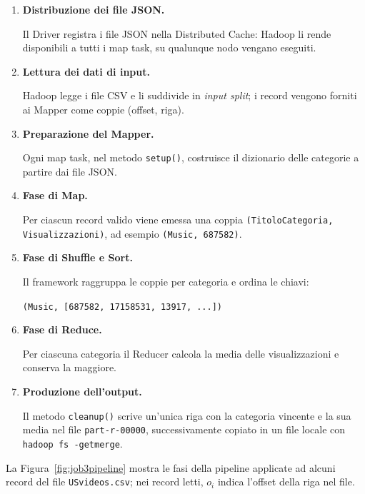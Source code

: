 \documentclass[12pt, a4paper]{article}
\begin{document}
\begin{enumerate}

    \item \textbf{Distribuzione dei file JSON.}

    Il Driver registra i file JSON nella Distributed Cache:
    Hadoop li rende disponibili a tutti i map task,
    su qualunque nodo vengano eseguiti.

    \item \textbf{Lettura dei dati di input.}

    Hadoop legge i file CSV e li suddivide in
    \textit{input split}; i record vengono forniti
    ai Mapper come coppie (offset, riga).

    \item \textbf{Preparazione del Mapper.}

    Ogni map task, nel metodo \texttt{setup()},
    costruisce il dizionario delle categorie
    a partire dai file JSON.

    \item \textbf{Fase di Map.}

    Per ciascun record valido viene emessa
    una coppia \texttt{(TitoloCategoria, Visualizzazioni)},
    ad esempio \texttt{(Music, 687582)}.

    \item \textbf{Fase di Shuffle e Sort.}

    Il framework raggruppa le coppie per categoria
    e ordina le chiavi:

    \begin{center}
        \texttt{(Music, [687582, 17158531, 13917, ...])}
    \end{center}

    \item \textbf{Fase di Reduce.}

    Per ciascuna categoria il Reducer calcola la media
    delle visualizzazioni e conserva la maggiore.

    \item \textbf{Produzione dell'output.}

    Il metodo \texttt{cleanup()} scrive un'unica riga
    con la categoria vincente e la sua media nel file
    \texttt{part-r-00000}, successivamente copiato
    in un file locale con \texttt{hadoop fs -getmerge}.

\end{enumerate}

\needspace{13cm}
La Figura~\ref{fig:job3pipeline} mostra le fasi della pipeline
applicate ad alcuni record del file \texttt{USvideos.csv};
nei record letti, $o_i$ indica l'offset della riga nel file.
\end{document}
